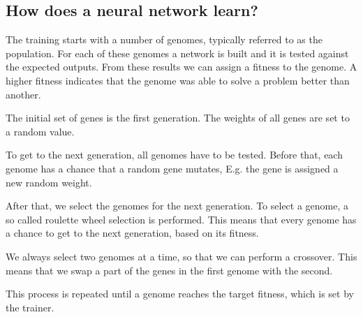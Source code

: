\subsection{How does a neural network learn?}

The training starts with a number of genomes, typically referred to as the population. For each of these genomes a network is built and it is tested against the expected outputs. From these results we can assign a fitness to the genome. A higher fitness indicates that the genome was able to solve a problem better than another. \cite{Anderson1995}

The initial set of genes is the first generation. The weights of all genes are set to a random value.

To get to the next generation, all genomes have to be tested. Before that, each genome has a chance that a random gene mutates, E.g. the gene is assigned a new random weight.

After that, we select the genomes for the next generation. To select a genome, a so called roulette wheel selection is performed. This means that every genome has a chance to get to the next generation, based on its fitness. \cite{Baeck1996}

We always select two genomes at a time, so that we can perform a crossover. This means that we swap a part of the genes in the first genome with the second. \cite{Buckland}

This process is repeated until a genome reaches the target fitness, which is set by the trainer.

